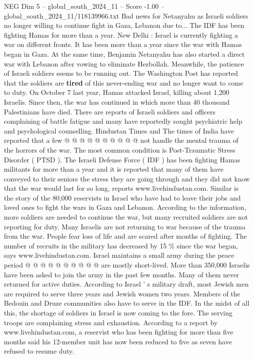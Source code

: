 \begin{textsample}{NEG Dim 5 – global\_south\_2024\_11 – Score -1.00 – global\_south\_2024\_11/118139966.txt}  \label{ex:f5_neg_430}
Bad news for Netanyahu as Israeli soldiers no longer willing to continue fight in Gaza, Lebanon due to...
The IDF has been fighting Hamas for more than a year.
New Delhi : Israel is currently fighting a war on different fronts.
It has been more than a year since the war with Hamas began in Gaza.
At the same time, Benjamin Netanyahu has also started a direct war with Lebanon after vowing to eliminate Hezbollah.
Meanwhile, the patience of Israeli soldiers seems to be running out.
The Washington Post has reported that the soldiers are \textbf{tired} of this never-ending war and no longer want to come to duty.
On October 7 last year, Hamas attacked Israel, killing about 1,200 Israelis.
Since then, the war has continued in which more than 40 thousand Palestinians have died.
There are reports of Israeli soldiers and officers complaining of battle fatigue and many have reportedly sought psychiatric help and psychological counselling.
Hindustan Times and The times of India have reported that a few @ @ @ @ @ @ @ @ @ @ not handle the mental trauma of the horrors of the war.
The most common condition is Post-Traumatic Stress Disorder ( PTSD ).
The Israeli Defense Force ( IDF ) has been fighting Hamas militants for more than a year and it is reported that many of them have conveyed to their seniors the stress they are going through and they did not know that the war would last for so long, reports www.livehindustan.com.
Similar is the story of the 80,000 reservists in Israel who have had to leave their jobs and loved ones to fight the wars in Gaza and Lebanon.
According to the information, more soldiers are needed to continue the war, but many recruited soldiers are not reporting for duty.
Many Israelis are not returning to war because of the trauma from the war.
People fear loss of life and are scared after months of fighting.
The number of recruits in the military has decreased by 15 \% since the war began, says www.livehindustan.com.
Israel maintains a small army during the peace period @ @ @ @ @ @ @ @ @ @ are mostly short-lived.
More than 350,000 Israelis have been asked to join the army in the past few months.
Many of them never returned for active duties.
According to Israel ' s military draft, most Jewish men are required to serve three years and Jewish women two years.
Members of the Bedouin and Druze communities also have to serve in the IDF.
In the midst of all this, the shortage of soldiers in Israel is now coming to the fore.
The serving troops are complaining stress and exhaustion.
According to a report by www.livehindustan.com, a reservist who has been fighting for more than five months said his 12-member unit has now been reduced to five as seven have refused to resume duty.

\end{textsample}
